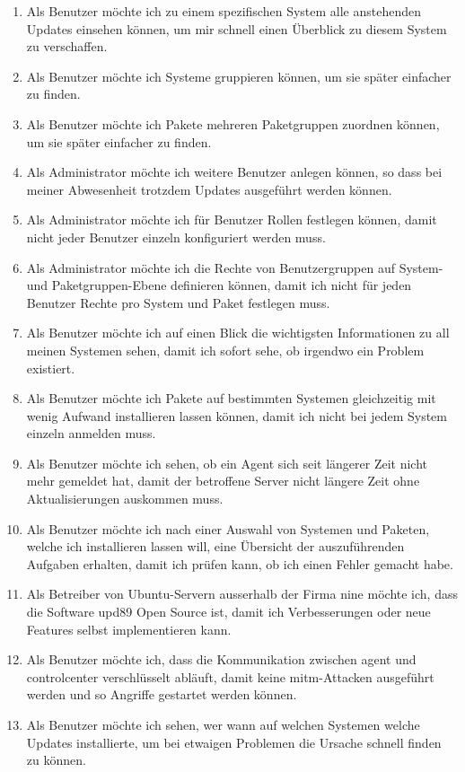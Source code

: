 \begin{enumerate}
    \item Als Benutzer möchte ich zu einem spezifischen System alle anstehenden Updates einsehen können, um mir schnell einen Überblick zu diesem System zu verschaffen.
    \item Als Benutzer möchte ich Systeme gruppieren können, um sie später einfacher zu finden.
    \item Als Benutzer möchte ich Pakete mehreren Paketgruppen zuordnen können, um sie später einfacher zu finden.
    \item Als Administrator möchte ich weitere Benutzer anlegen können, so dass bei meiner Abwesenheit trotzdem Updates ausgeführt werden können.
    \item Als Administrator möchte ich für Benutzer Rollen festlegen können, damit nicht jeder Benutzer einzeln konfiguriert werden muss.
    \item Als Administrator möchte ich die Rechte von Benutzergruppen auf System- und Paketgruppen-Ebene definieren können, damit ich nicht für jeden Benutzer Rechte pro System und Paket festlegen muss.
    \item Als Benutzer möchte ich auf einen Blick die wichtigsten Informationen zu all meinen Systemen sehen, damit ich sofort sehe, ob irgendwo ein Problem existiert.
    \item Als Benutzer möchte ich Pakete auf bestimmten Systemen gleichzeitig mit wenig Aufwand installieren lassen können, damit ich nicht bei jedem System einzeln anmelden muss.
    \item Als Benutzer möchte ich sehen, ob ein Agent sich seit längerer Zeit nicht mehr gemeldet hat, damit der betroffene Server nicht längere Zeit ohne Aktualisierungen auskommen muss.
    \item Als Benutzer möchte ich nach einer Auswahl von Systemen und Paketen, welche ich installieren lassen will, eine Übersicht der auszuführenden Aufgaben erhalten, damit ich prüfen kann, ob ich einen Fehler gemacht habe.
    \item Als Betreiber von Ubuntu-Servern ausserhalb der Firma \gls{nine} möchte ich, dass die Software \gls{upd89} Open Source ist, damit ich Verbesserungen oder neue Features selbst implementieren kann.
    \item Als Benutzer möchte ich, dass die Kommunikation zwischen \gls{agent} und \gls{controlcenter} verschlüsselt abläuft, damit keine \gls{mitm}-Attacken ausgeführt werden und so Angriffe gestartet werden können.
    \item Als Benutzer möchte ich sehen, wer wann auf welchen Systemen welche Updates installierte, um bei etwaigen Problemen die Ursache schnell finden zu können.

\end{enumerate}
